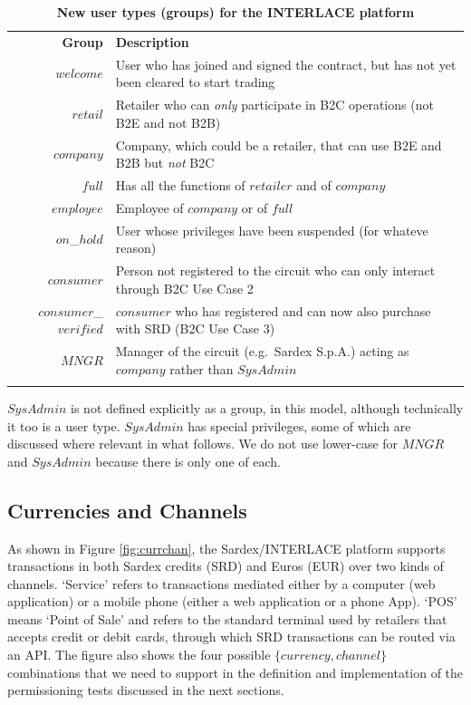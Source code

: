 \setlength{\tabcolsep}{10pt}
\begin{table}[h]
\vspace{-0.3cm}
\begin{centering}
\small
{
\begin{tabular}{ r | l  }
\hline
\textbf{Group}	& \textbf{Description} \\
\Xhline{1.5pt}
$welcome$ & User who has joined and signed the contract, but has not yet been cleared to start trading \\
\hline
$retail$ & Retailer who can \emph{only} participate in B2C operations (not B2E and not B2B) \\
\hline
$company$ & Company, which could be a retailer, that can use B2E and B2B but \emph{not} B2C \\
\hline
$full$ & Has all the functions of $retailer$ and of $company$ \\
\hline
$employee$ & Employee of $company$ or of $full$ \\
\hline
$on$\_$hold$ & User whose privileges have been suspended (for whateve reason) \\
\hline
$consumer$ & Person not registered to the circuit who can only interact through B2C Use Case 2 \\
\hline
$consumer$\_$verified$ & $consumer$ who has registered and can now also purchase with SRD (B2C Use Case 3)  \\
\hline
$MNGR$ & Manager of the circuit (e.g.\ Sardex S.p.A.) acting as $company$ rather than $SysAdmin$ \\
\Xhline{1.5pt}
\end{tabular}
}
\caption{\small\textbf{New user types (groups) for the INTERLACE platform}}
\label{tab:groups}
\end{centering}
\vspace{-0.7cm}
\end{table}

$SysAdmin$ is not defined explicitly as a group, in this model, although technically it too is a user type. $SysAdmin$ has special privileges, some of which are discussed where relevant in what follows. We do not use lower-case for $MNGR$ and $SysAdmin$ because there is only one of each.

\subsection{Currencies and Channels}
As shown in Figure \ref{fig:currchan}, the Sardex/INTERLACE platform supports transactions in both Sardex credits (SRD) and Euros (EUR) over two kinds of channels. `Service' refers to transactions mediated either by a computer (web application) or a mobile phone (either a web application or a phone App). `POS' means `Point of Sale' and refers to the standard terminal used by retailers that accepts credit or debit cards, through which SRD transactions can be routed via an API. The figure also shows the four possible $\{ currency, channel \}$ combinations that we need to support in the definition and implementation of the permissioning tests discussed in the next sections.

